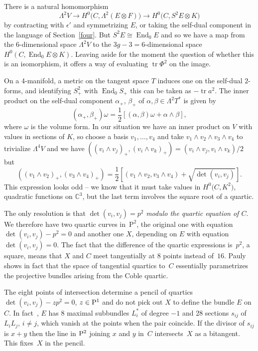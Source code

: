 \documentclass[pdftex]{sigma}
\numberwithin{equation}{section}
\begin{document}
There is a natural homomorphism
\[ \Lambda^2V\rightarrow H^0\big(C, \Lambda^2(E\otimes F)\big)\rightarrow H^0\big(C, S^2E\otimes K\big)\]
by contracting with $\epsilon'$ and symmetrizing $E$, or taking the self-dual component in the language of Section~\ref{four}. But $S^2E\cong \operatorname{End}_0 E$ and so we have a map from the $6$-dimensional space $\Lambda^2V$ to the $3g-3=6$-dimensional space $H^0(C, \operatorname{End}_0 E\otimes K)$. Leaving aside for the moment the question of whether this is an isomorphism, it offers a way of evaluating $\operatorname{tr} \Phi^2$ on the image.

On a 4-manifold, a metric on the tangent space $T$ induces one on the self-dual $2$-forms, and identifying $S^2_+$ with $ \operatorname{End} _0 S_+$ this can be taken as $-\operatorname{tr} a^2$. The inner product on the self-dual component $\alpha_+$, $\beta_+$ of $\alpha,\beta\in \Lambda^2T^*$ is given by
\[
(\alpha_+,\beta_+)\omega=\frac{1}{2}\left[(\alpha,\beta)\omega+\alpha\wedge\beta\right],
\]
where $\omega$ is the volume form.
In our situation we have an inner product on $V$ with values in sections of $K$, so choose a basis $v_1,\dots, v_4$ and take $v_1\wedge v_2\wedge v_3\wedge v_4$ to trivialize $\Lambda^4V$ and we have $((v_i\wedge v_j)_+,(v_i\wedge v_k)_+)=(v_i\wedge v_j,v_i\wedge v_k)/2$ but
\[
((v_1\wedge v_2)_+,(v_3\wedge v_4)_+)=\frac{1}{2}\left[(v_1\wedge v_2,v_3\wedge v_4)+\sqrt{\det(v_i,v_j)} \right].
\]
This expression looks odd -- we know that it must take values in $H^0\big(C,K^2\big)$, quadratic functions on ${\mathbb C}^3$, but the last term involves the square root of a quartic.

The only resolution is that $\det(v_i,v_j)= p^2$ {\it modulo the quartic equation of $C$}. We therefore have two quartic curves in~$\mathrm{P}^2$, the original one with equation $\det(v_i,v_j)- p^2=0$ and another one $X$, depending on $E$ with equation $\det(v_i,v_j)=0$. The fact that the difference of the quartic expressions is~$p^2$, a square, means that $X$ and $C$ meet tangentially at $8$ points instead of~$16$. Pauly shows in fact that the space of tangential quartics to~$C$ essentially parametrizes the projective bundles arising from the Coble quartic.

\begin{Remark}
The eight points of intersection determine a pencil of quartics $\det(v_i,v_j)- zp^2=0$, $z\in {\rm P}^1$ and do not pick out $X$ to define the bundle $E$ on $C$. In fact~\cite{Pauly}, $E$ has 8 maximal subbundles $L^*_i$ of degree $-1$ and 28 sections $s_{ij}$ of $L_iL_j$, $i\ne j$, which vanish at the points when the pair coincide. If the divisor of $s_{ij}$ is $x+y$ then the line in ${\rm P}^2$ joining $x$ and $y$ in~$C$ intersects~$X$ as a bitangent. This fixes~$X$ in the pencil.
\end{Remark}
\end{document}

